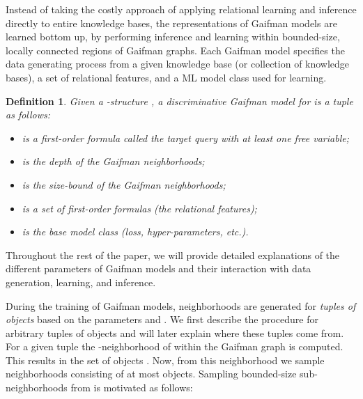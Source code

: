\documentclass{article}
\newtheorem{definition}{Definition}
\begin{document}
Instead of taking the costly approach of applying relational learning and inference directly to entire knowledge bases, the representations of Gaifman models are learned bottom up, by performing inference and learning within bounded-size, locally connected regions of Gaifman graphs.
Each Gaifman model specifies the data generating process from a given knowledge base (or collection of knowledge bases), a set of relational features, and a ML model class used for learning.

\begin{definition}
Given a -structure , a discriminative Gaifman model for  is a tuple  as follows:
\begin{itemize}
\item  is a first-order formula called the \emph{target query} with at least one free variable; 

\item  is the \emph{depth} of the Gaifman neighborhoods;

\item  is the \emph{size-bound} of the Gaifman neighborhoods;



\item  is a set of first-order formulas (the relational features); 

\item  is the base model class (loss, hyper-parameters, etc.).
\end{itemize}
\end{definition}




Throughout the rest of the paper, we will provide detailed explanations of the different parameters of Gaifman models and their interaction with data generation,  learning, and inference. 

During the training of Gaifman models, neighborhoods are generated for \emph{tuples of objects}  based on the parameters  and . We first describe the procedure for arbitrary tuples  of objects and will later explain where these tuples come from. For a given tuple  the -neighborhood of  within the Gaifman graph is computed. This results in the set of objects . Now, from this neighborhood we sample  neighborhoods consisting of at most  objects. Sampling bounded-size sub-neighborhoods from  is motivated as follows:
\end{document}
